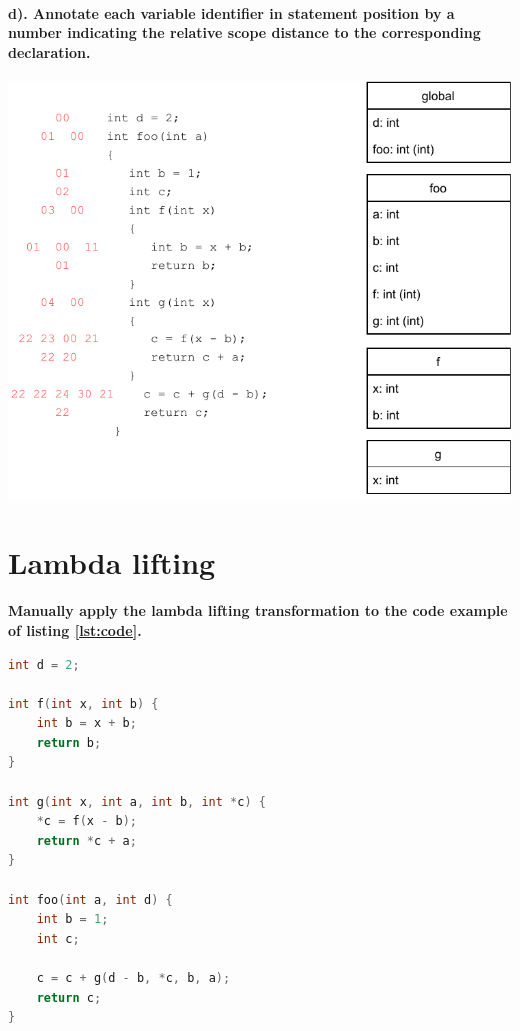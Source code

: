 \documentclass[hidelinks]{uva-inf-article}
\begin{document}
\begin{flushleft}
\paragraph{d). Annotate each variable identifier in statement position by a number indicating the relative scope distance to the corresponding declaration.\\}
\includegraphics[width=14cm]{images/1d.pdf}
\newpage
\section{Lambda lifting}
\textbf{Manually apply the lambda lifting transformation to the code example of listing \ref{lst:code}.}
\begin{lstlisting}[basicstyle=\small, language=C, label=lst:lambda, caption=Lambda lifting transformation, captionpos=b]
int d = 2;

int f(int x, int b) {
	int b = x + b;
	return b;
}

int g(int x, int a, int b, int *c) {
	*c = f(x - b);
	return *c + a;
}

int foo(int a, int d) {
	int b = 1;
	int c;

	c = c + g(d - b, *c, b, a);
	return c;
}
\end{lstlisting}
\newpage

\end{flushleft}
\end{document}
